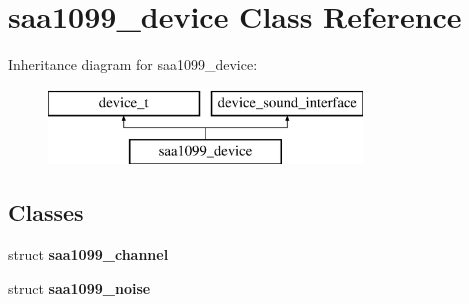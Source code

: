 \hypertarget{classsaa1099__device}{\section{saa1099\-\_\-device Class Reference}
\label{classsaa1099__device}
}
Inheritance diagram for saa1099\-\_\-device\-:\begin{figure}[H]
\begin{center}
\leavevmode
\includegraphics[height=2.000000cm]{classsaa1099__device}
\end{center}
\end{figure}
\subsection*{Classes}
\begin{DoxyCompactItemize}
\item 
struct {\bfseries saa1099\-\_\-channel}
\item 
struct {\bfseries saa1099\-\_\-noise}
\end{DoxyCompactItemize}
